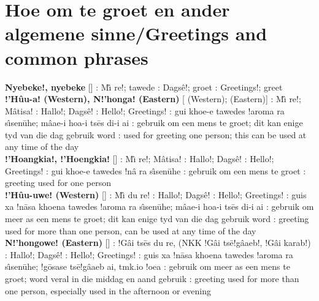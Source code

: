 \markboth{}{}
\tocless\section{Hoe om te groet en ander algemene sinne/Greetings and\\
common phrases}
\markboth{}{}

\textbf{Nyebeke!, nyebeke} [] : M\^{\i} re!; tawede
: Dags\^{e}!; groet : Greetings!; greet
\\

\textbf{!'H\^{u}u-a! (Western), N!'honga! (Eastern)}
[ (Western);
 (Eastern)] : M\^{\i} re!;
M\^{a}tisa! : Hallo!; Dags\^{e}! : Hello!;
Greetings! : \textvertline{}gui khoe-e tawedes !aroma
ra s\^{\i}sen\={u}he; m\^{a}\textdoublevertline{}ae-i hoa-i ts\={e}s
di-i ai : gebruik om een mens te groet; dit kan enige
tyd van die dag gebruik word : used for greeting one
person; this can be used at any time of the day \\

\textbf{!'Hoangkia!, !'Hoengkia!}
[] : M\^{\i} re!;
M\^{a}tisa! : Hallo!; Dags\^{e}! : Hello!;
Greetings! : \textvertline{}gui khoe-e tawedes !n\^{a}
ra s\^{\i}sen\={u}he : gebruik om een mens te groet
: greeting used for one person \\

\textbf{!'H\^{u}u-uwe! (Western)}
[] : M\^{\i}
du re! : Hallo!; Dags\^{e}! : Hello!;
Greetings! : \textvertline{}guis xa !n\={a}sa khoena
tawedes !aroma ra s\^{\i}sen\={u}he; m\^{a}\textdoublevertline{}ae-i
hoa-i ts\={e}s di-i ai : gebruik om meer as een mens te
groet; dit kan enige tyd van die dag gebruik word :
greeting used for more than one person, can be used at any time of the
day \\

\textbf{N!'hongowe! (Eastern)} []
: !G\^{a}i ts\={e}s du re, (NKK !G\^{a}i
ts\={e}!g\^{a}\textdoublevertline{}aeb!, !G\^{a}i karab!)
: Hallo!; Dags\^{e}! : Hello!; Greetings!
: \textvertline{}guis xa !n\={a}sa khoena tawedes
!aroma ra s\^{\i}sen\={u}he; !g\={o}sase
ts\={e}!g\^{a}\textdoublevertline{}aeb ai, tmk.io !oea :
gebruik om meer as een mens te groet; word veral in die middag en aand
gebruik : greeting used for more than one person,
especially used in the afternoon or evening \\

